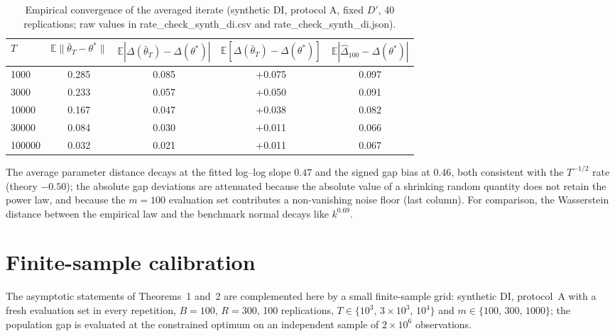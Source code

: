 \documentclass[11pt]{article}
\newcommand{\E}{\mathbb{E}}
\newcommand{\tbar}{\bar\theta}
\newcommand{\dhat}{\hat\Delta}
\begin{document}
\begin{table}[h]
\centering
\small
\caption{Empirical convergence of the averaged iterate (synthetic DI, protocol A, fixed $D'$, 40 replications; raw values in rate_check_synth_di.csv and rate_check_synth_di.json).}
\label{tab:rate}
\begin{tabular}{lcccc}
\toprule
$T$ & $\E\|\tbar_T-\theta^*\|$ & $\E|\Delta(\tbar_T)-\Delta(\theta^*)|$ & $\E[\Delta(\tbar_T)-\Delta(\theta^*)]$ & $\E|\dhat_{100}-\Delta(\theta^*)|$ \\
\midrule
1000 & 0.285 & 0.085 & +0.075 & 0.097 \\
3000 & 0.233 & 0.057 & +0.050 & 0.091 \\
10000 & 0.167 & 0.047 & +0.038 & 0.082 \\
30000 & 0.084 & 0.030 & +0.011 & 0.066 \\
100000 & 0.032 & 0.021 & +0.011 & 0.067 \\
\bottomrule
\end{tabular}
\end{table}

The average parameter distance decays at the fitted log--log slope $0.47$ and the signed
gap bias at $0.46$, both consistent with the $T^{-1/2}$ rate (theory $-0.50$); the absolute gap
deviations are attenuated because the absolute value of a shrinking random quantity does not retain
the power law, and because the $m=100$ evaluation set contributes a non-vanishing noise floor
(last column).  For comparison, the Wasserstein distance between the empirical law and the benchmark
normal decays like $k^{0.69}$.


\section{Finite-sample calibration}

The asymptotic statements of Theorems~1 and~2 are complemented here by a small
finite-sample grid: synthetic DI, protocol~A with a fresh evaluation set in every repetition,
$B=100$, $R=300$, 100 replications, $T\in\{10^3,\,3\times10^3,\,10^4\}$ and
$m\in\{100,\,300,\,1000\}$; the population gap is evaluated at the constrained optimum on an
independent sample of $2\times10^6$ observations.
\end{document}
